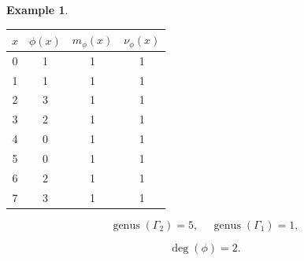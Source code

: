 \documentclass[12pt,letterpaper]{article}
\theoremstyle{definition}
\newtheorem{example}[theorem]{Example}
\DeclareMathOperator{\genus}{genus}
\begin{document}
\begin{example}
{\begin{center}
\begin{tabular}{c|c|c|c}  
  $x$ & $\phi(x)$ & $m_\phi(x)$ & $\nu_\phi(x)$ \\ \hline
  0   &    1   &        1         &  1   \\ 
  1   &    1   &        1         &  1   \\ 
  2   &    3   &        1         &  1   \\ 
  3   &    2   &        1         &  1   \\ 
  4   &    0   &        1         &  1   \\ 
  5   &    0   &        1         &  1    \\ 
  6   &    2   &        1         &  1   \\ 
  7   &    3   &        1         &  1   \\ 
\end{tabular}
\end{center}

\[
  \genus(\Gamma_2) =5,\ \ \ \ \
  \genus(\Gamma_1) =1,
\]

\[
\deg(\phi) =2.
\]


}
\end{example}
\end{document}
